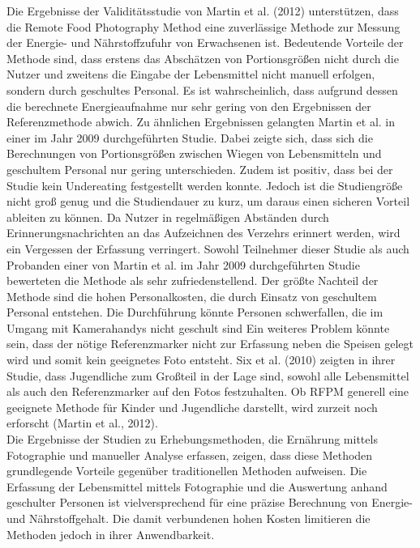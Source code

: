 Die Ergebnisse der Validitätsstudie von Martin et al. (2012) unterstützen, dass die Remote Food Photography Method eine zuverlässige Methode zur Messung der Energie- und Nährstoffzufuhr von Erwachsenen ist. Bedeutende Vorteile der Methode sind, dass erstens das Abschätzen von Portionsgrößen nicht durch die Nutzer und zweitens die Eingabe der Lebensmittel nicht manuell erfolgen, sondern durch geschultes Personal. Es ist wahrscheinlich, dass aufgrund dessen die berechnete Energieaufnahme nur sehr gering von den Ergebnissen der Referenzmethode abwich. Zu ähnlichen Ergebnissen  gelangten Martin et al. in einer im Jahr 2009 durchgeführten Studie. Dabei zeigte sich, dass sich die Berechnungen von Portionsgrößen zwischen Wiegen von Lebensmitteln und geschultem Personal nur gering unterschieden. Zudem ist positiv, dass bei der Studie kein Undereating festgestellt werden konnte. Jedoch ist die Studiengröße nicht groß genug und die Studiendauer zu kurz, um daraus einen sicheren Vorteil ableiten zu können. Da Nutzer in regelmäßigen Abständen durch Erinnerungsnachrichten an das Aufzeichnen des Verzehrs erinnert werden, wird ein Vergessen der Erfassung verringert. Sowohl Teilnehmer dieser Studie als auch Probanden einer von Martin et al. im Jahr 2009 durchgeführten Studie bewerteten die Methode als sehr zufriedenstellend. Der größte Nachteil der Methode sind die hohen Personalkosten, die durch Einsatz von geschultem Personal entstehen. Die Durchführung könnte Personen schwerfallen, die im Umgang mit Kamerahandys nicht geschult sind Ein weiteres Problem könnte sein, dass der nötige Referenzmarker nicht zur Erfassung neben die Speisen gelegt wird und somit kein geeignetes Foto entsteht. Six et al. (2010) zeigten in ihrer Studie, dass Jugendliche zum Großteil in der Lage sind, sowohl alle Lebensmittel als auch den Referenzmarker auf den Fotos festzuhalten. Ob RFPM generell eine geeignete Methode für Kinder und Jugendliche darstellt, wird zurzeit noch erforscht (Martin et al., 2012). \\
Die Ergebnisse der Studien zu Erhebungsmethoden, die Ernährung mittels Fotographie und manueller Analyse erfassen, zeigen, dass diese Methoden grundlegende Vorteile gegenüber traditionellen Methoden aufweisen. Die Erfassung der Lebensmittel mittels Fotographie und die Auswertung anhand geschulter Personen ist vielversprechend für eine präzise Berechnung von Energie- und Nährstoffgehalt. Die damit verbundenen hohen Kosten limitieren die Methoden jedoch in ihrer Anwendbarkeit. 

